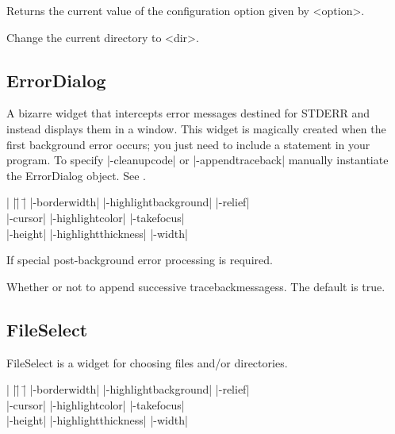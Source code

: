 \vskip5pt

\begin{enum}{1cm}

Returns the current value of the configuration option given by <option>. 

Change the current directory to <dir>.

\end{enum}

\subsection*{ErrorDialog}
A bizarre widget that intercepts error messages destined for STDERR and instead displays
them in a window.  This widget is magically created when the first background error
occurs; you just need to include a  statement in your program.
To specify |-cleanupcode| or |-appendtraceback| manually instantiate the ErrorDialog
object.  See .
\vskip5pt
\vskip5pt
\vspace{-4pt}

\begin{tabbing}
|                   |\=|                     |\= \kill
|-borderwidth| \> |-highlightbackground|     \> |-relief| \\   
|-cursor|      \> |-highlightcolor|          \> |-takefocus| \\
|-height|      \> |-highlightthickness|      \> |-width| \\
\end{tabbing}

\vskip5pt
\begin{enum}{1cm}

 If special post-background error processing is required.

 Whether or not to append successive tracebackmessagess.  The
default is true.

\end{enum}

\subsection*{FileSelect}
FileSelect is a widget for choosing files and/or directories.
\vspace{-4pt}
\vskip5pt
\begin{tabbing}
|                   |\=|                     |\= \kill
|-borderwidth| \> |-highlightbackground|     \> |-relief| \\   
|-cursor|      \> |-highlightcolor|          \> |-takefocus| \\
|-height|      \> |-highlightthickness|      \> |-width| \\
\end{tabbing}

